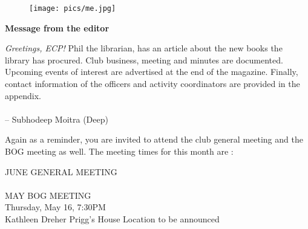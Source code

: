\documentclass[10pt,a4paper]{article}
\newcommand{\NewsItem}[1]{%
		\usefont{T1}{augie}{m}{n} 	
		\large \bf #1 \vspace{4pt}
		\par \normalsize \normalfont}
\begin{document}
\begin{center}
\begin{minipage}[h]{0.8\linewidth}
	\begin{wrapfigure}{l}{0.41\textwidth}
		\texttt{[image: pics/me.jpg]}
		\\%
	\end{wrapfigure}
	
	\NewsItem{Message from the editor}

	\emph{Greetings, ECP!}  Phil the librarian, has an article about the new books the library has procured. Club business, meeting and minutes are documented. Upcoming events of interest are advertised at the end of the magazine. Finally, contact information of the officers and activity coordinators are provided in the appendix. 
\\
\\
-- Subhodeep Moitra (Deep)

\vspace{0.5cm}



	Again as a reminder, you are invited to attend the club general meeting and the BOG meeting as well. The meeting times for this month are :
	
\vspace{1cm}

\begin{multicols}{2}
\Large



JUNE GENERAL MEETING\\
\\

MAY BOG MEETING\\
Thursday, May 16, 7:30PM\\
Kathleen Dreher Prigg's House
Location to be announced

\normalsize
\end{multicols}
	
\end{minipage}
\end{center}

\pagebreak
\clearpage
\end{document}

